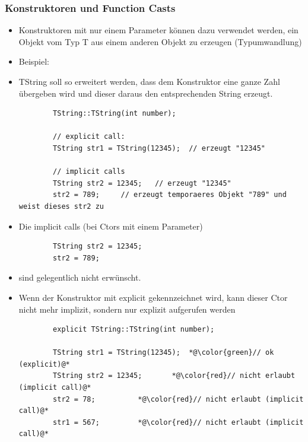 \subsubsection{Konstruktoren und Function Casts}
\label{sec:Konstruktoren und Function Casts}
\begin{itemize}
	\item Konstruktoren mit nur einem Parameter können dazu verwendet werden, ein Objekt vom Typ T aus einem anderen Objekt zu erzeugen (Typumwandlung)
	\item Beispiel:
	\item[\-] TString soll so erweitert werden, dass dem Konstruktor eine ganze Zahl übergeben wird und dieser daraus den entsprechenden String erzeugt.
	\begin{minipage}{\linewidth}
		\begin{lstlisting}
		TString::TString(int number);
		
		// explicit call:
		TString str1 = TString(12345);	// erzeugt "12345"
		
		// implicit calls
		TString str2 = 12345;	// erzeugt "12345"
		str2 = 789;		// erzeugt temporaeres Objekt "789" und weist dieses str2 zu
		\end{lstlisting}
	\end{minipage}
\end{itemize}

\begin{itemize}
	\item Die implicit calls (bei Ctors mit einem Parameter)
	\begin{minipage}{\linewidth}
		\begin{lstlisting}
		TString str2 = 12345;
		str2 = 789;
		\end{lstlisting}
	\end{minipage}
	\item[\-] sind gelegentlich nicht erwünscht.
	\item Wenn der Konstruktor mit explicit gekennzeichnet wird, kann dieser Ctor nicht mehr implizit, sondern nur explizit aufgerufen werden
	\begin{minipage}{\linewidth}
		\begin{lstlisting}
		explicit TString::TString(int number);
		
		TString str1 = TString(12345);	*@\color{green}// ok (explicit)@*
		TString str2 = 12345;		*@\color{red}// nicht erlaubt (implicit call)@*
		str2 = 78;			*@\color{red}// nicht erlaubt (implicit call)@*
		str1 = 567;			*@\color{red}// nicht erlaubt (implicit call)@*
		\end{lstlisting}
	\end{minipage}
\end{itemize}


